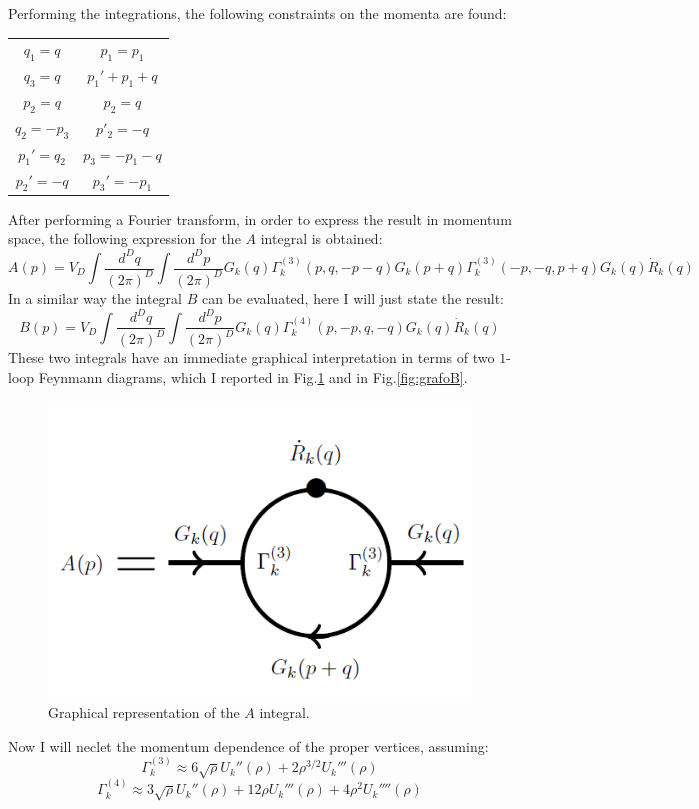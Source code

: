 Performing the integrations, the following constraints on the momenta are found:
\begin{center}
\begin{tabular}{cc}
$q_1 = q$ & $p_1 = p_1$\\
$q_3 = q$ & $p_1' + p_1 + q$\\
$p_2 = q$ & $p_2 = q$\\
$q_2 = -p_3$ & $p'_2 = -q$\\
$p_1' = q_2$ & $p_3 = -p_1 - q$\\
$p_2' = -q$ & $p_3' = -p_1$
\end{tabular}
\end{center}
After performing a Fourier transform, in order to express the result in momentum space, the following 
expression for the $A$ integral is obtained:
\begin{equation}
 A(p) = V_D\int \frac{d^Dq}{(2\pi)^D}\int\frac{d^Dp}{(2\pi)^D}G_k(q)\Gamma^{(3)}_k(p, q, -p - q)G_k(p+q)\Gamma^{(3)}_k(-p,-q, p+q)G_k(q) \dot{R}_k(q)
\end{equation}
In a similar way the integral $B$ can be evaluated, here I will just state the result:
\begin{equation}
B(p) = V_D \int \frac{d^Dq}{(2\pi)^D} \int\frac{d^Dp}{(2\pi)^D}G_k(q)\Gamma_k^{(4)}(p,-p,q,-q)G_k(q)\dot{R}_k(q)
\end{equation}
These two integrals have an immediate graphical interpretation in terms of two $1$-loop Feynmann diagrams, which I reported in Fig.\ref{fig:grafoA} and in Fig.\ref{fig:grafoB}.
\begin{figure}
\begin{center}
\includegraphics[scale=0.55]{Immagini/grafoA.png}
\caption{Graphical representation of the $A$ integral.}
\label{fig:grafoA}
\end{center}
\end{figure}
Now I will neclet the momentum dependence of the proper vertices, assuming:
$$\Gamma_k^{(3)} \approx 6\sqrt{\rho} U_k''(\rho) + 2\rho^{3/2} U_k'''(\rho)$$
$$\Gamma_k^{(4)} \approx 3\sqrt{\rho} U_k''(\rho) + 12\rho U_k'''(\rho)+ 4\rho^2 U_k''''(\rho)$$

